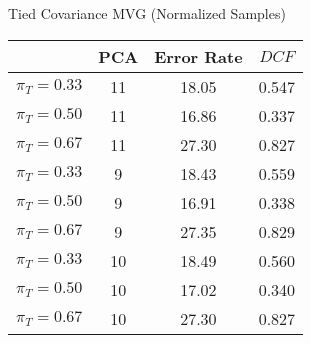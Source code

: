 \caption{Tied Covariance MVG (Normalized Samples)}\label{tab:mvgn_tiedcov}
\begin{center}
\begin{tabular}{|c|c||c|c|}
\hline
\ & PCA & Error Rate & $DCF$\\
\hline
$\pi_T = 0.33$ & 11 & 18.05 & 0.547 \\
$\pi_T = 0.50$ & 11 & 16.86 & 0.337 \\
$\pi_T = 0.67$ & 11 & 27.30 & 0.827 \\
\hline
$\pi_T = 0.33$ & 9 & 18.43 & 0.559 \\
$\pi_T = 0.50$ & 9 & 16.91 & 0.338 \\
$\pi_T = 0.67$ & 9 & 27.35 & 0.829 \\
\hline
$\pi_T = 0.33$ & 10 & 18.49 & 0.560 \\
$\pi_T = 0.50$ & 10 & 17.02 & 0.340 \\
$\pi_T = 0.67$ & 10 & 27.30 & 0.827 \\
\hline
\end{tabular}
\end{center}
